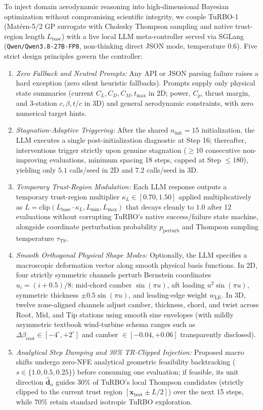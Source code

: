 \documentclass[11pt,fleqn,letterpaper]{article}
\begin{document}
To inject domain aerodynamic reasoning into high-dimensional Bayesian optimization without compromising scientific integrity, we couple TuRBO-1 (Mat\'ern-5/2 GP surrogate with Cholesky Thompson sampling and native trust-region length $L_{\text{base}}$) with a live local LLM meta-controller served via SGLang (\texttt{Qwen/Qwen3.8-27B-FP8}, non-thinking direct JSON mode, temperature $0.6$). Five strict design principles govern the controller:
\begin{enumerate}
\setlength{\itemsep}{1pt}\setlength{\parskip}{0pt}\setlength{\topsep}{2pt}
\item \emph{Zero Fallback and Neutral Prompts:} Any API or JSON parsing failure raises a hard exception (zero silent heuristic fallbacks). Prompts supply only physical state summaries (current $C_L, C_D, C_M, t_{\max}$ in 2D; power, $C_p$, thrust margin, and 3-station $c, \beta, t/c$ in 3D) and general aerodynamic constraints, with zero numerical target hints.
\item \emph{Stagnation-Adaptive Triggering:} After the shared $n_{\text{init}}=15$ initialization, the LLM executes a single post-initialization diagnostic at Step 16; thereafter, interventions trigger strictly upon genuine stagnation ($\ge 10$ consecutive non-improving evaluations, minimum spacing 18 steps, capped at Step $\le 180$), yielding only $5.1$ calls/seed in 2D and $7.2$ calls/seed in 3D.
\item \emph{Temporary Trust-Region Modulation:} Each LLM response outputs a temporary trust-region multiplier $\kappa_L \in [0.70, 1.50]$ applied multiplicatively as $L = \text{clip}(L_{\text{base}}\cdot\kappa_L, L_{\min}, L_{\max})$ that decays cleanly to $1.0$ after 12 evaluations without corrupting TuRBO's native success/failure state machine, alongside coordinate perturbation probability $p_{\text{perturb}}$ and Thompson sampling temperature $\tau_{\text{TS}}$.
\item \emph{Smooth Orthogonal Physical Shape Modes:} Optionally, the LLM specifies a macroscopic deformation vector along smooth physical basis functions. In 2D, four strictly symmetric channels perturb Bernstein coordinates $u_i = (i+0.5)/8$: mid-chord camber $\sin(\pi u)$, aft loading $u^2\sin(\pi u)$, symmetric thickness $\pm 0.5\sin(\pi u)$, and leading-edge weight $w_{\text{LE}}$. In 3D, twelve zone-aligned channels adjust camber, thickness, chord, and twist across Root, Mid, and Tip stations using smooth sine envelopes (with mildly asymmetric textbook wind-turbine schema ranges such as $\Delta\beta_{\text{root}} \in [-4^\circ, +2^\circ]$ and camber $\in [-0.04, +0.06]$ transparently disclosed).
\item \emph{Analytical Step Damping and 30\% TR-Clipped Injection:} Proposed macro shifts undergo zero-NFE analytical geometric feasibility backtracking ($s \in \{1.0, 0.5, 0.25\}$) before consuming one evaluation; if feasible, its unit direction $\hat{\mathbf{d}}_u$ guides $30\%$ of TuRBO's local Thompson candidates (strictly clipped to the current trust region $[\mathbf{x}_{\text{best}} \pm L/2]$) over the next 15 steps, while $70\%$ retain standard isotropic TuRBO exploration.
\end{enumerate}
\end{document}

